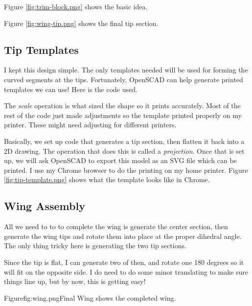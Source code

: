 Figure \ref{fig:trim-block.png} shows the basic idea.



Figure \ref{fig:wing-tip.png} shows the final tip section.


\subsection{Tip Templates}

I kept this design simple. The only templates needed will be used for forming
the curved segments at the tips. Fortunately, OpenSCAD can help generate
printed templates we can use! Here is the code used.


The {\it scale} operation is what sized the shape so it prints accurately. Most
of the rest of the code just made adjustments so the template printed properly
on my printer. These might need adjusting for different printers.

Basically, we set up code that generates a tip section, then flatten it back
into a 2D drawing. The operation that does this is called a {\it projection}.
Once that is set up, we will ask OpenSCAD to export this model as an SVG file
which can be printed. I use my Chrome browser to do the printing on my home
printer.  Figure \ref{fig:tip-template.png} shows what the template looks like
in Chrome.


\subsection{Wing Assembly}

All we need to to to complete the wing is generate the center section, then
generate the wing tips and rotate them into place at the proper dihedral angle.
The only thing tricky here is generating the two tip sections.

Since the tip is flat, I can generate two of then, and rotate one 180 degrees
so it will fit on the opposite side. I do need to do some minor translating to
make sure things line up, but by now, this is getting easy!

Figure{fig:wing.png}{Final Wing} shows the completed wing.

